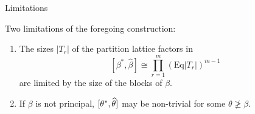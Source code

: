 \documentclass[xcolor=dvipsnames,9pt]{beamer}
\newcommand{\Eq}{\mbox{Eq}}
\newcommand{\<}{\langle}	     %
\renewcommand{\>}{\rangle}	     %
\begin{document}

\begin{frame}[fragile,label=Limitations,shrink=5]{Limitations}

\vskip5mm

Two limitations of the foregoing construction:
\begin{enumerate}
\item The sizes $|T_r|$ of the partition lattice factors in 
\[
[\beta^*, \widehat{\beta}] \cong \prod_{r=1}^m (\Eq |T_r|)^{m-1}
\] 
are limited by the size of the blocks of $\beta$.

\vskip3mm

\item If $\beta$ is not principal, 
$[\theta^*, \widehat{\theta}]$ may be non-trivial for some $\theta \ngeq \beta$.
\end{enumerate}
\end{frame}
\end{document}
